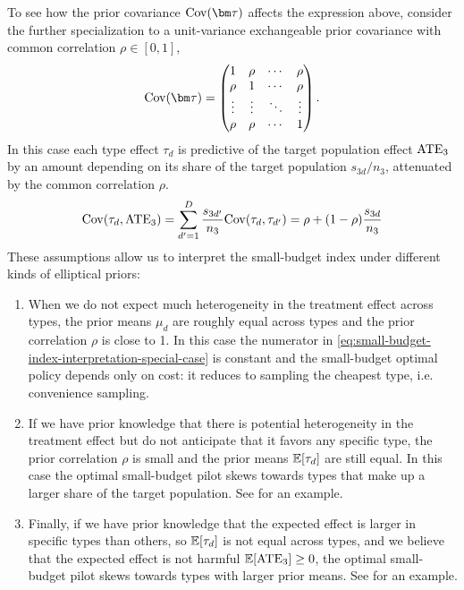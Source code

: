 To see how the prior covariance $\cov(\bm\tau)$ affects the expression above, consider the further specialization to a unit-variance exchangeable prior covariance with common correlation $\rho\in[0,1]$,
\[
  \cov(\bm\tau) =
  \begin{pmatrix}
    1 & \rho & \cdots & \rho \\
    \rho & 1 & \cdots & \rho \\
    \vdots & \vdots & \ddots & \vdots \\
    \rho & \rho & \cdots & 1
  \end{pmatrix}.
\]
In this case each type effect $\tau_d$ is predictive of the target population effect $\mathrm{ATE}_3$ by an amount depending on its share of the target population $s_{3d}/n_3$, attenuated by the common correlation $\rho$.
\begin{equation}
  \cov(\tau_d, \ATE_3)
  =
  \sum_{d'=1}^D \frac{s_{3d'}}{n_3}\cov(\tau_d, \tau_{d'})
  =
  \rho + (1-\rho)\frac{s_{3d}}{n_3}
  \label{eq:small-budget-index-interpretation-special-case-cov}
\end{equation}
These assumptions allow us to interpret the small-budget index under different kinds of elliptical priors:
\begin{enumerate}
  \item {
      When we do not expect much heterogeneity in the treatment effect across types, the prior means $\mu_d$ are roughly equal across types and the prior correlation $\rho$ is close to 1.
      In this case the numerator in \eqref{eq:small-budget-index-interpretation-special-case} is constant and the small-budget optimal policy depends only on cost: it reduces to sampling the cheapest type, i.e. convenience sampling.
    }
  \item {
      If we have prior knowledge that there is potential heterogeneity in the treatment effect but do not anticipate that it favors any specific type, the prior correlation $\rho$ is small and the prior means $\mathbb{E}[\tau_d]$ are still equal.
      In this case the optimal small-budget pilot skews towards types that make up a larger share of the target population.
      See  for an example.
    }
  \item {
      Finally, if we have prior knowledge that the expected effect is larger in specific types than others, so $\mathbb{E}[\tau_d]$ is not equal across types, and we believe that the expected effect is not harmful $\mathbb{E}[\mathrm{ATE}_3]\ge 0$, the optimal small-budget pilot skews towards types with larger prior means.
      See  for an example.
    }
\end{enumerate}
